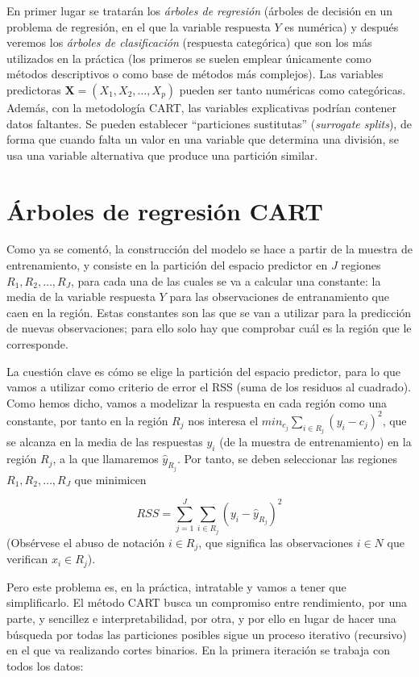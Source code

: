 \documentclass[
  spanish,
]{book}
\theoremstyle{break}
\theoremstyle{definition}
\theoremstyle{definition}
\theoremstyle{definition}
\theoremstyle{definition}
\theoremstyle{remark}
\begin{document}
En primer lugar se tratarán los \emph{árboles de regresión} (árboles de decisión en un problema de regresión, en el que la variable respuesta \(Y\) es numérica) y después veremos los \emph{árboles de clasificación} (respuesta categórica) que son los más utilizados en la práctica (los primeros se suelen emplear únicamente como métodos descriptivos o como base de métodos más complejos).
Las variables predictoras \(\mathbf{X}=(X_1, X_2, \ldots, X_p)\) pueden ser tanto numéricas como categóricas.
Además, con la metodología CART, las variables explicativas podrían contener datos faltantes.
Se pueden establecer ``particiones sustitutas'' (\emph{surrogate splits}), de forma que cuando falta un valor en una variable que determina una división, se usa una variable alternativa que produce una partición similar.

\hypertarget{uxe1rboles-de-regresiuxf3n-cart}{%
\section{Árboles de regresión CART}\label{uxe1rboles-de-regresiuxf3n-cart}}

Como ya se comentó, la construcción del modelo se hace a partir de la muestra de entrenamiento, y
consiste en la partición del espacio predictor en \(J\) regiones
\(R_1, R_2, \ldots, R_J\), para cada una de las cuales se va a calcular una constante:
la media de la variable respuesta \(Y\) para las observaciones de entranamiento que
caen en la región. Estas constantes son las que se van a utilizar para
la predicción de nuevas observaciones; para ello solo hay que comprobar cuál es
la región que le corresponde.

La cuestión clave es cómo se elige la partición del espacio predictor, para lo
que vamos a utilizar como criterio de error el RSS (suma de los residuos al cuadrado).
Como hemos dicho, vamos a modelizar la respuesta en cada región como una constante,
por tanto en la región \(R_j\) nos interesa el
\(min_{c_j} \sum_{i\in R_j} (y_i - c_j)^2\), que se alcanza en la media de las
respuestas \(y_i\) (de la muestra de entrenamiento) en la región \(R_j\),
a la que llamaremos \(\widehat y_{R_j}\).
Por tanto, se deben seleccionar las regiones \(R_1, R_2, \ldots, R_J\) que minimicen

\[RSS = \sum_{j=1}^{J} \sum_{i\in R_j} (y_i - \widehat y_{R_j})^2\]
(Obsérvese el abuso de notación \(i\in R_j\), que significa las observaciones
\(i\in N\) que verifican \(x_i \in R_j\)).

Pero este problema es, en la práctica, intratable y vamos a tener que simplificarlo.
El método CART busca un compromiso
entre rendimiento, por una parte, y sencillez e interpretabilidad, por otra, y por ello
en lugar de hacer una búsqueda por todas las particiones posibles sigue un proceso
iterativo (recursivo) en el que va realizando cortes binarios. En la primera iteración
se trabaja con todos los datos:
\end{document}
